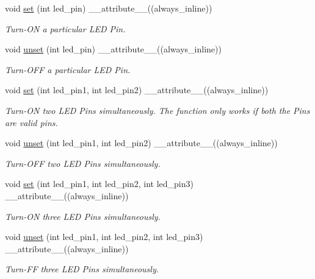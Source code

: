 \begin{DoxyCompactItemize}
\item 
void \hyperlink{classLEDSet_a8f5431c0b3c059c43353cf7e3d02ca62}{set} (int led\+\_\+pin) \+\_\+\+\_\+attribute\+\_\+\+\_\+((always\+\_\+inline))
\begin{DoxyCompactList}\small\item\em Turn-\/\+ON a particular L\+ED Pin. \end{DoxyCompactList}\item 
void \hyperlink{classLEDSet_aacc3566d74c4051350977b578ada3a4d}{unset} (int led\+\_\+pin) \+\_\+\+\_\+attribute\+\_\+\+\_\+((always\+\_\+inline))
\begin{DoxyCompactList}\small\item\em Turn-\/\+O\+FF a particular L\+ED Pin. \end{DoxyCompactList}\item 
void \hyperlink{classLEDSet_a9912385e65dddd78cf0f41cce4fbcba2}{set} (int led\+\_\+pin1, int led\+\_\+pin2) \+\_\+\+\_\+attribute\+\_\+\+\_\+((always\+\_\+inline))
\begin{DoxyCompactList}\small\item\em Turn-\/\+ON two L\+ED Pins simultaneously. The function only works if both the Pins are valid pins. \end{DoxyCompactList}\item 
void \hyperlink{classLEDSet_ac84aa5b9e72689bbfd71f556995dfe03}{unset} (int led\+\_\+pin1, int led\+\_\+pin2) \+\_\+\+\_\+attribute\+\_\+\+\_\+((always\+\_\+inline))
\begin{DoxyCompactList}\small\item\em Turn-\/\+O\+FF two L\+ED Pins simultaneously. \end{DoxyCompactList}\item 
void \hyperlink{classLEDSet_a5dba15c24ec18e11f82368d203ceb9f1}{set} (int led\+\_\+pin1, int led\+\_\+pin2, int led\+\_\+pin3) \+\_\+\+\_\+attribute\+\_\+\+\_\+((always\+\_\+inline))
\begin{DoxyCompactList}\small\item\em Turn-\/\+ON three L\+ED Pins simultaneously. \end{DoxyCompactList}\item 
void \hyperlink{classLEDSet_a1a6a52e4fd96dd8500861df0a9d0066d}{unset} (int led\+\_\+pin1, int led\+\_\+pin2, int led\+\_\+pin3) \+\_\+\+\_\+attribute\+\_\+\+\_\+((always\+\_\+inline))
\begin{DoxyCompactList}\small\item\em Turn-\/\+FF three L\+ED Pins simultaneously. \end{DoxyCompactList}\item 

\end{DoxyCompactItemize}
